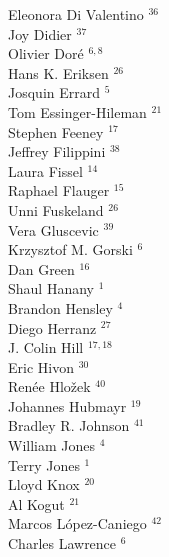 \documentclass[PICOAPC.tex]{subfiles}
\begin{document}
{\begin{multicols}{4}
Eleonora Di Valentino $^{36}$           \\
Joy Didier $^{37}$                      \\
Olivier Dor\'e $^{6,8}$                  \\
Hans K. Eriksen $^{26}$                 \\
Josquin Errard $^{5}$                  \\
Tom Essinger-Hileman $^{21}$            \\
Stephen Feeney $^{17}$                  \\
Jeffrey Filippini $^{38}$               \\
Laura Fissel $^{14}$                    \\
Raphael Flauger $^{15}$                 \\
Unni Fuskeland $^{26}$                  \\
Vera Gluscevic $^{39}$                  \\
Krzysztof M. Gorski $^{6}$             \\
Dan Green $^{16}$                       \\
Shaul Hanany $^{1}$                    \\
Brandon Hensley $^{4}$                 \\
Diego Herranz $^{27}$                   \\
J. Colin Hill $^{17,18}$                   \\
Eric Hivon $^{30}$                      \\
Ren\'{e}e  Hlo\v{z}ek $^{40}$           \\
Johannes Hubmayr $^{19}$                \\
Bradley R. Johnson $^{41}$              \\
William Jones $^{4}$                   \\
Terry Jones $^{1}$                     \\
Lloyd Knox $^{20}$                      \\
Al Kogut $^{21}$                        \\
Marcos L\'{o}pez-Caniego $^{42}$        \\
Charles Lawrence $^{6}$                \\

\end{multicols}}
\end{document}

